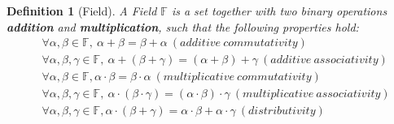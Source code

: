 \documentclass{article}
\newtheorem{definition}{Definition}[section] %
\begin{document}
\begin{definition}[Field] A Field $\mathbb{F}$ is a set together with two binary operations \textbf{addition} and \textbf{multiplication}, such that the following properties hold:
    \begin{equation}
    \begin{split}
    & \forall \alpha, \beta \in \mathbb{F}, \ \alpha+\beta=\beta+\alpha \ (additive \ commutativity) \\
    & \forall \alpha, \beta, \gamma \in \mathbb{F}, \ \alpha+(\beta+\gamma)=(\alpha+\beta)+\gamma \ (additive \ associativity) \\
    & \forall \alpha, \beta \in \mathbb{F}, \alpha \cdot \beta = \beta \cdot \alpha \ (multiplicative \ commutativity) \\
    & \forall \alpha, \beta, \gamma \in \mathbb{F}, \ \alpha \cdot (\beta \cdot \gamma)=(\alpha \cdot \beta) \cdot \gamma \ (multiplicative \ associativity) \\
    & \forall \alpha, \beta, \gamma \in \mathbb{F}, \alpha \cdot (\beta + \gamma)=\alpha \cdot \beta + \alpha \cdot \gamma \ (distributivity) \\
    \end{split}
    \end{equation}
\end{definition}






\end{document}
